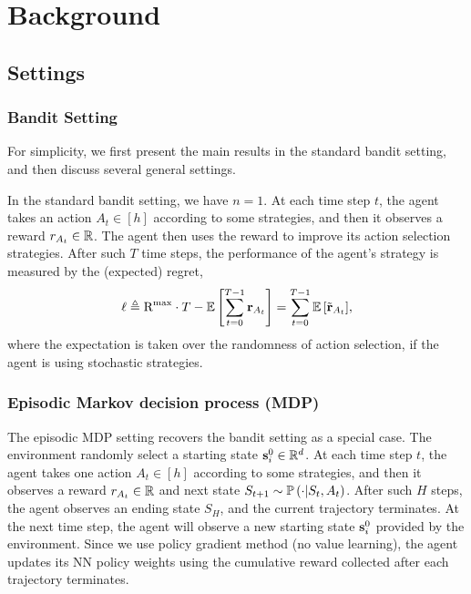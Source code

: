 \section{Background}

\subsection{Settings}

\subsubsection{Bandit Setting}

For simplicity, we first present the main results in the standard bandit setting, and then discuss several general settings.

In the standard bandit setting, we have $n = 1$. At each time step $t$, the agent takes an action $A_t \in [h]$ according to some strategies, and then it observes a reward $r_{A_t} \in {\mathbb{R}}$. The agent then uses the reward to improve its action selection strategies. After such $T$ time steps, the performance of the agent's strategy is measured by the (expected) regret,
\begin{equation*}
    \ell \triangleq {\text{R}}^{\max} \cdot T - {\mathbb{E}} \left[ \sum\limits_{t=0}^{T-1}{  {\mathbf{r}}_{A_t}  } \right] = \sum\limits_{t=0}^{T-1}{ {\mathbb{E}} \left[ {\tilde{\mathbf{r}}}_{A_t} \right] },
\end{equation*}
where the expectation is taken over the randomness of action selection, if the agent is using stochastic strategies.

\subsubsection{Episodic Markov decision process (MDP)}

The episodic MDP setting recovers the bandit setting as a special case. The environment randomly select a starting state ${\mathbf{s}}_i^0 \in {\mathbb{R}}^d$. At each time step $t$, the agent takes one action $A_t \in [h]$ according to some strategies, and then it observes a reward $r_{A_t} \in {\mathbb{R}}$ and next state $S_{t+1} \sim {\mathbb{P}}\left( \cdot \middle| S_t, A_t \right)$. After such $H$ steps, the agent observes an ending state $S_H$, and the current trajectory terminates. At the next time step, the agent will observe a new starting state ${\mathbf{s}}_i^0$ provided by the environment. Since we use policy gradient method (no value learning), the agent updates its NN policy weights using the cumulative reward collected after each trajectory terminates.

